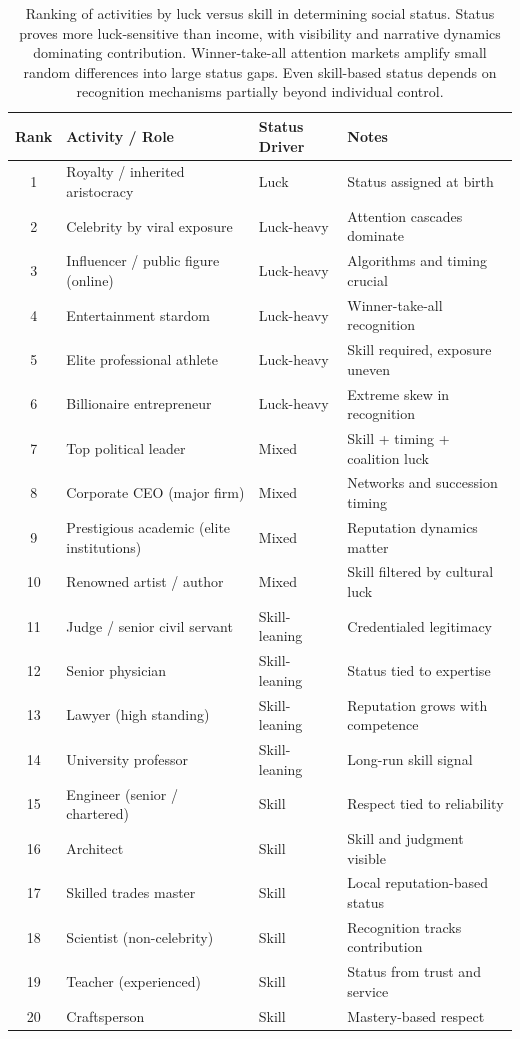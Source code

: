   \begin{table}[H]
    \centering
    \small
    \begin{tabular}{clll}
      \toprule
      \textbf{Rank} & \textbf{Activity / Role} & \textbf{Status Driver} & \textbf{Notes} \\
      \midrule
      1 & Royalty / inherited aristocracy & Luck & Status assigned at birth \\
      2 & Celebrity by viral exposure & Luck-heavy & Attention cascades dominate \\
      3 & Influencer / public figure (online) & Luck-heavy & Algorithms and timing crucial \\
      4 & Entertainment stardom & Luck-heavy & Winner-take-all recognition \\
      5 & Elite professional athlete & Luck-heavy & Skill required, exposure uneven \\
      6 & Billionaire entrepreneur & Luck-heavy & Extreme skew in recognition \\
      7 & Top political leader & Mixed & Skill + timing + coalition luck \\
      8 & Corporate CEO (major firm) & Mixed & Networks and succession timing \\
      9 & Prestigious academic (elite institutions) & Mixed & Reputation dynamics matter \\
      10 & Renowned artist / author & Mixed & Skill filtered by cultural luck \\
      11 & Judge / senior civil servant & Skill-leaning & Credentialed legitimacy \\
      12 & Senior physician & Skill-leaning & Status tied to expertise \\
      13 & Lawyer (high standing) & Skill-leaning & Reputation grows with competence \\
      14 & University professor & Skill-leaning & Long-run skill signal \\
      15 & Engineer (senior / chartered) & Skill & Respect tied to reliability \\
      16 & Architect & Skill & Skill and judgment visible \\
      17 & Skilled trades master & Skill & Local reputation-based status \\
      18 & Scientist (non-celebrity) & Skill & Recognition tracks contribution \\
      19 & Teacher (experienced) & Skill & Status from trust and service \\
      20 & Craftsperson & Skill & Mastery-based respect \\
      \bottomrule
    \end{tabular}
    \caption{Ranking of activities by luck versus skill in determining social status. Status proves more luck-sensitive than income, with visibility and narrative dynamics dominating contribution. Winner-take-all attention markets amplify small random differences into large status gaps. Even skill-based status depends on recognition mechanisms partially beyond individual control.}
    \label{tab:status_rankings}
  \end{table}

